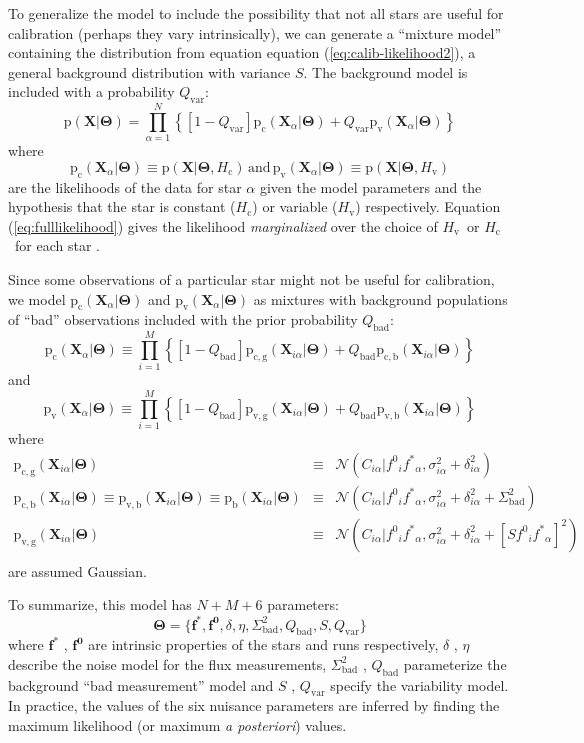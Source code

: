 \documentclass[12pt,preprint]{aastex}
\newcommand{\foreign}[1]{\emph{#1}}
\newcommand{\eqlabel}[1]{\label{eq:#1}}
\renewcommand{\eqref}[1]{\ref{eq:#1}}
\newcommand{\Eq}[1]{Equation (\eqref{#1})}
\newcommand{\eq}[1]{equation (\eqref{#1})}
\newcommand{\paramvector}[1]{\boldsymbol{#1}}
\newcommand{\normal}[3]{\mathcal{N} (#1 | #2, #3)}
\renewcommand{\Pr}{\mathrm{p}}
\newcommand{\model}     {\ensuremath{\paramvector{\Theta}} }
\newcommand{\data}      {\ensuremath{\mathbf{X}} }
\newcommand{\X}         {\ensuremath{\mathbf{X}} }
\newcommand{\fstar}     {\ensuremath{f^*} }
\newcommand{\fstarvec}  {\ensuremath{\mathbf{\fstar}} }
\newcommand{\fzero}     {\ensuremath{f^0}}
\newcommand{\fzerovec}  {\ensuremath{\mathbf{\fzero}} }
\newcommand{\jabs}      {\ensuremath{\delta} }
\newcommand{\jrel}      {\ensuremath{\eta} }
\newcommand{\jitter}[1] {\ensuremath{\delta_{#1}^2} }
\newcommand{\Sbad}      {\ensuremath{\Sigma_\mathrm{bad}^2} }
\newcommand{\Qbad}      {\ensuremath{Q_\mathrm{bad}} }
\newcommand{\Qvar}      {\ensuremath{Q_\mathrm{var}} }
\newcommand{\Svar}      {\ensuremath{S} }
\newcommand{\const}     {\ensuremath{H_\mathrm{c}}}
\newcommand{\var}       {\ensuremath{H_\mathrm{v}}}
\newcommand{\pconst}    {\ensuremath{\Pr_\mathrm{c} (\X_\alpha | \model) }}
\newcommand{\pvar}      {\ensuremath{\Pr_\mathrm{v} (\X_\alpha | \model) }}
\newcommand{\pbad}      {\ensuremath{\Pr_\mathrm{b} (\X_{i\alpha} | \model)} }
\newcommand{\pvarbad}   {\ensuremath{\Pr_\mathrm{v,b} (\X_{i\alpha} | \model)} }
\newcommand{\pvargood}  {\ensuremath{\Pr_\mathrm{v,g} (\X_{i\alpha} | \model)} }
\newcommand{\pconstbad} {\ensuremath{\Pr_\mathrm{c,b} (\X_{i\alpha} | \model)} }
\newcommand{\pconstgood}{\ensuremath{\Pr_\mathrm{c,g} (\X_{i\alpha} | \model)} }
\begin{document}
To generalize the model to include the possibility that not all stars are
useful for calibration (perhaps they vary intrinsically), we can generate a
``mixture model'' containing the distribution from equation
\eq{calib-likelihood2}, a general background distribution with variance
$\Svar$.  The background model is included with a probability $\Qvar$:
\begin{equation}
    \eqlabel{fulllikelihood}
    \Pr (\data | \model) = \prod_{\alpha=1} ^{N} \left \{ [1-\Qvar]
        \pconst + \Qvar
        \pvar \right \}
\end{equation}
where
\begin{equation}
    \pconst \equiv \Pr(\data | \model, \const) \, \mathrm{and} \,
    \pvar \equiv \Pr(\data | \model, \var)
\end{equation}
are the likelihoods of the data for star $\alpha$ given the model parameters and
the hypothesis that the star is constant (\const) or variable (\var) respectively.
\Eq{fulllikelihood} gives the likelihood {\em marginalized}
over the choice of \var\ or \const\ for each star \citep[e.g.][]{Hogg:2010}.

Since some observations
of a particular star might not be useful for calibration, we model
$\pconst$ and $\pvar$ as mixtures with background
populations of ``bad'' observations included with the prior probability $\Qbad$:
\begin{equation}
    \pconst \equiv \prod_{i=1}^M \left \{
    [1-\Qbad] \pconstgood + \Qbad \pconstbad \right \}
\end{equation}
and
\begin{equation}
    \pvar \equiv \prod_{i=1}^M \left \{
    [1-\Qbad] \pvargood + \Qbad \pvarbad \right \}
\end{equation}
where
\begin{eqnarray}
    \pconstgood & \equiv &
        \normal{C_{i\alpha}}{\fzero_i \fstar_\alpha}{\sigma_{i\alpha}^2 +
            \jitter{i\alpha}} \\
    \pconstbad \equiv \pvarbad \equiv \pbad & \equiv &
        \normal{C_{i\alpha}}{\fzero_i \fstar_\alpha}{\sigma_{i\alpha}^2 +
        \jitter{i\alpha} + \Sbad} \\
    \pvargood & \equiv &
        \normal{C_{i\alpha}}{\fzero_i \fstar_\alpha}{\sigma_{i\alpha}^2 +
        \jitter{i\alpha} + [\Svar \fzero_i \fstar_\alpha]^2} \\
\end{eqnarray}
are assumed Gaussian.

To summarize, this model has $N+M+6$ parameters:
\begin{equation}
    \model = \{ \fstarvec, \fzerovec, \jabs, \jrel, \Sbad, \Qbad, \Svar, \Qvar \}
\end{equation}
where \fstarvec, \fzerovec are intrinsic properties of the stars and runs
respectively, \jabs, \jrel describe the noise model for the flux measurements,
\Sbad, \Qbad parameterize the background ``bad measurement'' model and \Svar,
\Qvar specify the variability model.  In practice, the values of the six nuisance
parameters are inferred by finding the maximum likelihood (or maximum
\foreign{a posteriori}) values.
\end{document}
